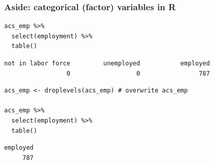 \documentclass[slidestop,compress,mathserif,12pt,t,professionalfonts,xcolor=table]{beamer}
\begin{document}
\begin{frame}[fragile]
\frametitle{Aside: categorical (factor) variables in R}

{\footnotesize
\begin{Verbatim}[frame=single, formatcom=\color{blue}]
acs_emp %>%
  select(employment) %>%
  table()
\end{Verbatim}

\pause

\begin{Verbatim}[frame=single, formatcom=\color{gray}]
not in labor force         unemployed           employed 
                 0                  0                787
\end{Verbatim}

\pause

\begin{Verbatim}[frame=single, formatcom=\color{blue}]
acs_emp <- droplevels(acs_emp) # overwrite acs_emp

acs_emp %>%
  select(employment) %>%
  table()
\end{Verbatim}

\begin{Verbatim}[frame=single, formatcom=\color{gray}]
employed 
     787 
\end{Verbatim}
}

\end{frame}

\end{document}
